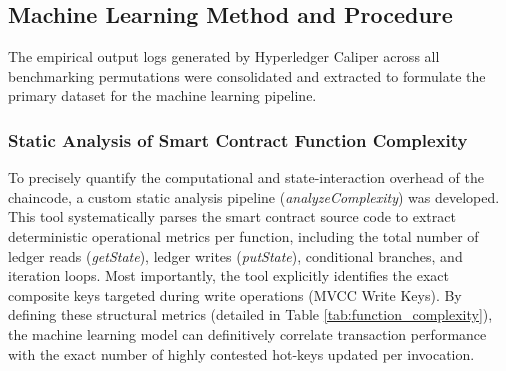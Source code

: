 \documentclass[12pt]{article}
\begin{document}
\subsection{Machine Learning Method and Procedure}

The empirical output logs generated by Hyperledger Caliper across all benchmarking permutations were consolidated and extracted to formulate the primary dataset for the machine learning pipeline.

\subsubsection{Static Analysis of Smart Contract Function Complexity}

To precisely quantify the computational and state-interaction overhead of the chaincode, a custom static analysis pipeline (\textit{analyzeComplexity}) was developed. This tool systematically parses the smart contract source code to extract deterministic operational metrics per function, including the total number of ledger reads (\textit{getState}), ledger writes (\textit{putState}), conditional branches, and iteration loops. Most importantly, the tool explicitly identifies the exact composite keys targeted during write operations (MVCC Write Keys). By defining these structural metrics (detailed in Table \ref{tab:function_complexity}), the machine learning model can definitively correlate transaction performance with the exact number of highly contested hot-keys updated per invocation.

\begin{table}[ht]
\centering
\caption{Static Analysis of Smart Contract Function Complexity and MVCC Hot-Keys}
\label{tab:function_complexity}
\end{table}
\end{document}
